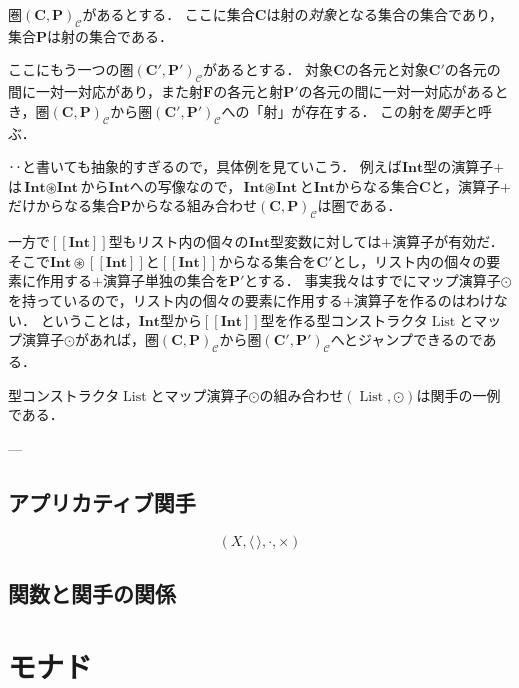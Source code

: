 \documentclass[twocolumn]{jsbook}
\def\[{[\![}
\def\]{]\!]}
\newcommand{\hsklType}[1]{\textbf{#1}}
\newcommand{\hsklTypeConstructor}[1]{\mathop{\mathrm{#1}}}
\DeclareMathOperator{\hsklListConstructor}{\hsklTypeConstructor{List}}
\newcommand{\hsklInt}{\hsklType{Int}}
\newcommand{\hsklMap}{\odot}
\newcommand{\hsklListType}[1]{\[#1\]}
\DeclareMathOperator{\mathSetTimes}{\circledast}
\newcommand{\mathSet}[1]{\mathbf{#1}}
\newcommand{\mathCategoryShort}[2]{(#1,#2)_\mathcal{C}}
\newcommand{\keyword}[1]{\emph{#1}}
\newcommand{\binaryfunctormap}{\cdot}
\begin{document}
圏$\mathCategoryShort{\mathSet{C}}{\mathSet{P}}$があるとする．
ここに集合$\mathSet{C}$は射の\keyword{対象}となる集合の集合であり，集合$\mathSet{P}$は射の集合である．

ここにもう一つの圏$\mathCategoryShort{\mathSet{C}'}{\mathSet{P}'}$があるとする．
対象$\mathSet{C}$の各元と対象$\mathSet{C}'$の各元の間に一対一対応があり，また射$\mathSet{F}$の各元と射$\mathSet{P}'$の各元の間に一対一対応があるとき，圏$\mathCategoryShort{\mathSet{C}}{\mathSet{P}}$から圏$\mathCategoryShort{\mathSet{C}'}{\mathSet{P}'}$への「射」が存在する．
この射を\keyword{関手}と呼ぶ．

‥と書いても抽象的すぎるので，具体例を見ていこう．
例えば$\hsklInt$型の演算子$+$は$\hsklInt\mathSetTimes\hsklInt$から$\hsklInt$への写像なので，$\hsklInt\mathSetTimes\hsklInt$と$\hsklInt$からなる集合$\mathSet{C}$と，演算子$+$だけからなる集合$\mathSet{P}$からなる組み合わせ$\mathCategoryShort{\mathSet{C}}{\mathSet{P}}$は圏である．

一方で$\hsklListType{\hsklInt}$型もリスト内の個々の$\hsklInt$型変数に対しては$+$演算子が有効だ．
そこで$\hsklInt\mathSetTimes{}\hsklListType{\hsklInt}$と$\hsklListType{\hsklInt}$からなる集合を$\mathSet{C}'$とし，リスト内の個々の要素に作用する$+$演算子単独の集合を$\mathSet{P}'$とする．
事実我々はすでにマップ演算子$\hsklMap$を持っているので，リスト内の個々の要素に作用する$+$演算子を作るのはわけない．
ということは，$\hsklInt$型から$\hsklListType{\hsklInt}$型を作る型コンストラクタ$\hsklListConstructor$とマップ演算子$\hsklMap$があれば，圏$\mathCategoryShort{\mathSet{C}}{\mathSet{P}}$から圏$\mathCategoryShort{\mathSet{C}'}{\mathSet{P}'}$へとジャンプできるのである．

型コンストラクタ$\hsklListConstructor$とマップ演算子$\hsklMap$の組み合わせ$(\hsklListConstructor,\hsklMap)$は関手の一例である．

---



\section{アプリカティブ関手}



$$(X,\langle\,\rangle,\binaryfunctormap,\times)$$


\section{関数と関手の関係}

\chapter{モナド}
\end{document}
